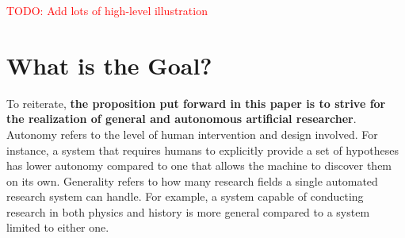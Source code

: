 \documentclass{book}
\begin{document}



\textcolor{red}{TODO: Add lots of high-level illustration}

\chapter{What is the Goal?}
\label{chapter-what-is-research}

To reiterate, \textbf{the proposition put forward in this paper is to strive for the realization of general and autonomous artificial researcher}. Autonomy refers to the level of human intervention and design involved. For instance, a system that requires humans to explicitly provide a set of hypotheses has lower autonomy compared to one that allows the machine to discover them on its own.  Generality refers to how many research fields a single automated research system can handle. For example, a system capable of conducting research in both physics and history is more general compared to a system limited to either one.
\end{document}
